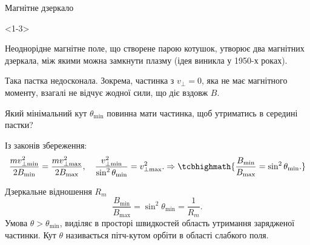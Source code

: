 \documentclass[]{beamer}
\begin{document}
\begin{frame}{Магнітне дзеркало}{}
	\begin{onlyenv}<1-3>
		\begin{block}{}
			Неоднорідне магнітне поле, що створене парою котушок, утворює два магнітних дзеркала, між
			якими можна замкнути плазму (ідея виникла у 1950-х роках).
		\end{block}
		\begin{center}
			
		\end{center}
	\end{onlyenv}
	\begin{overprint}
		\begin{block}{}
			Така пастка недосконала. Зокрема, частинка з $v_\perp = 0$, яка не має магнітного моменту, взагалі не відчує жодної сили, що діє вздовж $B$.
		\end{block}
		\begin{alertblock}{}
			Який мінімальний кут $\theta_{\min}$ повинна мати частинка, щоб утриматись в середині пастки?
		\end{alertblock}
		\onslide<2>%
		Із законів збереження:
		\begin{equation*}
			\frac{mv^2_{\perp\min}}{2B_{\min}} = \frac{mv^2_{\perp\max}}{2B_{\max}}, \quad
			\frac{v^2_{\perp\min}}{\sin^2\theta_{\min}} = v^2_{\perp\max}. \Rightarrow \tcbhighmath{\frac{B_{\min}}{B_{\max}} = \sin^2\theta_{\min}.}
		\end{equation*}
		\onslide<3>%
		\begin{block}{Дзеркальне відношення $R_m$}
			\begin{equation*}
				\frac{B_{\min}}{B_{\max}} = \sin^2\theta_{\min} = \frac1{R_m}.
			\end{equation*}
			Умова $\theta > \theta_{\min}$, виділяє в просторі швидкостей область утримання зарядженої частинки. Кут $\theta$ називається \alert{пітч-кутом орбіти в області слабкого поля}.
		\end{block}
	\end{overprint}
\end{frame}
\end{document}
